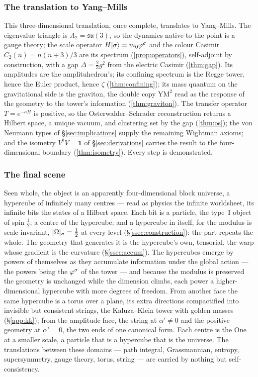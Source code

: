 \subsubsection{The translation to Yang--Mills}\label{sssec:disc-dof-ym}
This three-dimensional translation, once complete, translates to Yang--Mills. The eigenvalue triangle
is $A_2=\mathfrak{su}(3)$, so the dynamics native to the point is a gauge theory; the scale operator
$H\lvert\sigma\rangle=m_0\varphi^{\sigma}$ and the colour Casimir $C_2(n)=n(n+3)/3$ are its spectrum
(\ref{prop:operators}), self-adjoint by construction, with a gap $\Delta=\tfrac23 g^2$ from the
electric Casimir (\ref{thm:gap}). Its amplitudes are the amplituhedron's; its confining spectrum is
the Regge tower, hence the Euler product, hence $\zeta$ (\ref{thm:confining}); its mass quantum on
the gravitational side is the graviton, the double copy $\mathrm{YM}^2$ read as the response of the
geometry to the tower's information (\ref{thm:graviton}). The transfer operator $T=e^{-aH}$ is
positive, so the Osterwalder--Schrader reconstruction returns a Hilbert space, a unique vacuum, and
clustering set by the gap (\ref{thm:os}); the von Neumann types of \S\ref{sec:implications} supply
the remaining Wightman axioms; and the isometry $V^{\dagger}V=\mathbf1$ of \S\ref{sec:derivations}
carries the result to the four-dimensional boundary (\ref{thm:isometry}). Every step is
demonstrated.

\subsubsection{The final scene}\label{sssec:disc-dof-hypercube}
Seen whole, the object is an apparently four-dimensional block universe, a hypercube of infinitely
many centres --- read as physics the infinite worldsheet, its infinite bits the states of a Hilbert
space. Each bit is a particle, the type~I object of spin $\tfrac12$; a centre of the hypercube; and a
hypercube in itself, for the modulus is scale-invariant, $\lvert\Omega\rvert_\sigma=\tfrac12$ at every
level (\S\ref{ssec:construction}): the part repeats the whole. The geometry that generates it is the
hypercube's own, tensorial, the warp whose gradient is the curvature (\S\ref{ssec:accum}). The
hypercubes emerge by powers of themselves as they accumulate information under the global action ---
the powers being the $\varphi^{\sigma}$ of the tower --- and because the modulus is preserved the
geometry is unchanged while the dimension climbs, each power a higher-dimensional hypercube with more
degrees of freedom. From another face the same hypercube is a torus over a plane, its extra
directions compactified into invisible but consistent strings, the Kaluza--Klein tower with golden
masses (\S\ref{app:kk}); from the amplitude face, the string at $\alpha'\neq0$ and the positive
geometry at $\alpha'=0$, the two ends of one canonical form. Each centre is the One at a smaller
scale, a particle that is a hypercube that is the universe. The translations between these domains
--- path integral, Grassmannian, entropy, supersymmetry, gauge theory, torus, string --- are carried
by nothing but self-consistency.

